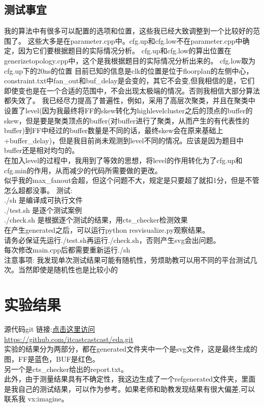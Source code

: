 \documentclass[12pt]{ctexart}
\begin{document}
\subsection{测试事宜}
我的算法中有很多可以配置的选项和位置，这些我已经大致调整到一个比较好的范围了。
这些大多是在parameter.cpp中。cfg.up和cfg.low不在parameter.cpp中确定，因为它们要根据题目的实际情况分析。
cfg.up和cfg.low的算出位置在generizetopology.cpp中，这个是我根据题目的实际情况分析出来的。 cfg.low取为cfg.up下的20ns的位置
目前已知的信息是clk的位置是位于floorplan的左侧中心，constraint.txt中fan\_out和buf\_delay是会变的，其它不会变,但我相信的是，它们即使变也是在一个合适的范围中，不会出现太极端的情况。否则我相信大部分算法都失效了。
我已经尽力提高了普遍性，例如，采用了高层次聚类，并且在聚类中设置了level(因为我最终将FF的skew转化为highlevelcluster之后的顶点的buffer的skew，但是要是聚类顶点的buffer(对buffer进行了聚类，从而产生的有代表性的buffer)到FF中经过的buffer数量是不同的话，最终skew会在原来基础上+buffer\_delay)，但是我目前尚未观测到level不同的情况。应该是因为题目中buffer还是相对均匀的。  \\
在加入level的过程中，我用到了等效的思想，将level的作用转化为了cfg.up和cfg.min的作用，从而减少的代码所需要做的更改。\\
似乎我的max\_fanout会超，但这个问题不大，规定是只要超了就扣1分，但是不管怎么超都没事。
测试:\\
./sh  是编译成可执行文件\\
./test.sh 是逐个测试案例\\
./check.sh 是根据逐个测试的结果，用cts\_checker检测效果  \\
在产生generated之后，可以运行python resvisualize.py观察结果。\\
请务必保证先运行./test.sh再运行./check.sh，否则产生svg会出问题。\\
每次修改main.cpp后都需要重新运行./sh   \\
注意事项:
我发现单次测试结果可能有随机性，劳烦助教可以用不同的平台测试几次。当然即使是随机性也是比较小的   \\
\section{实验结果}
源代码git 链接:\href{https://github.com/itcastcastcast/eda.git}{点击这里访问}\\
\url{https://github.com/itcastcastcast/eda.git} \\
实验的结果分为两部分，都在generated文件夹中一个是svg文件，这是最终生成的图，FF是蓝色，BUF是红色。 \\
另一个是cts\_checker给出的report.txt。   \\
此外，由于测量结果具有不确定性，我这边生成了一个refgenerated文件夹，里面是我自己的测试结果，可以作为参考。如果老师和助教发现结果有很大偏差,可以联系我 vx:imagine。
\end{document}
